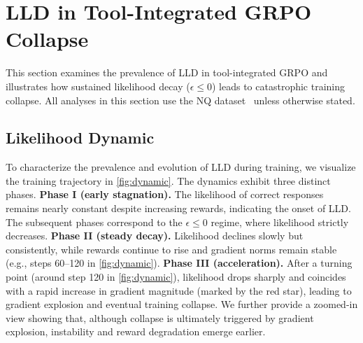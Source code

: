 \section{LLD in Tool-Integrated GRPO Collapse}
This section examines the prevalence of LLD in tool-integrated GRPO and illustrates how sustained likelihood decay ($\epsilon \leq 0$) leads to catastrophic training collapse. All analyses in this section use the NQ dataset~\citep{kwiatkowski2019natural} unless otherwise stated.
\subsection{Likelihood Dynamic}

To characterize the prevalence and evolution of LLD during training, we visualize the training trajectory in \cref{fig:dynamic}. The dynamics exhibit three distinct phases.
\textbf{Phase I (early stagnation).} The likelihood of correct responses remains nearly constant despite increasing rewards, indicating the onset of LLD. The subsequent phases correspond to the $\epsilon \leq 0$ regime, where likelihood strictly decreases.
\textbf{Phase II (steady decay).} Likelihood declines slowly but consistently, while rewards continue to rise and gradient norms remain stable (e.g., steps 60–120 in \cref{fig:dynamic}).
\textbf{Phase III (acceleration).} After a turning point (around step 120 in \cref{fig:dynamic}), likelihood drops sharply and coincides with a rapid increase in gradient magnitude (marked by the red star), leading to gradient explosion and eventual training collapse.
We further provide a zoomed-in view showing that, although collapse is ultimately triggered by gradient explosion, instability and reward degradation emerge earlier.
